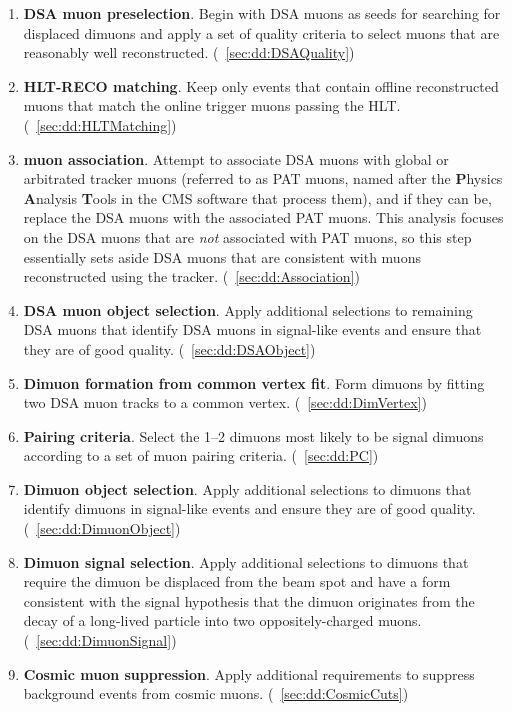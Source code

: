 \begin{enumerate}
  \item \textbf{DSA muon preselection}. Begin with DSA muons as seeds for searching for displaced dimuons and apply a set of quality criteria to select muons that are reasonably well reconstructed. (\Sec~\ref{sec:dd:DSAQuality})
  \item \textbf{HLT-RECO matching}. Keep only events that contain offline reconstructed muons that match the online trigger muons passing the HLT. (\Sec~\ref{sec:dd:HLTMatching})
  \item \textbf{\DSAToPAT muon association}. Attempt to associate DSA muons with global or arbitrated tracker muons (referred to as PAT muons, named after the \textbf{P}hysics \textbf{A}nalysis \textbf{T}ools in the CMS software that process them), and if they can be, replace the DSA muons with the associated PAT muons. This analysis focuses on the DSA muons that are \emph{not} associated with PAT muons, so this step essentially sets aside DSA muons that are consistent with muons reconstructed using the tracker. (\Sec~\ref{sec:dd:Association})
  \item \textbf{DSA muon object selection}. Apply additional selections to remaining DSA muons that identify DSA muons in signal-like events and ensure that they are of good quality. (\Sec~\ref{sec:dd:DSAObject})
  \item \textbf{Dimuon formation from common vertex fit}. Form dimuons by fitting two DSA muon tracks to a common vertex. (\Sec~\ref{sec:dd:DimVertex})
  \item \textbf{Pairing criteria}. Select the 1--2 dimuons most likely to be signal dimuons according to a set of muon pairing criteria. (\Sec~\ref{sec:dd:PC})
  \item \textbf{Dimuon object selection}. Apply additional selections to dimuons that identify dimuons in signal-like events and ensure they are of good quality. (\Sec~\ref{sec:dd:DimuonObject})
  \item \textbf{Dimuon signal selection}. Apply additional selections to dimuons that require the dimuon be displaced from the beam spot and have a form consistent with the signal hypothesis that the dimuon originates from the decay of a long-lived particle into two oppositely-charged muons. (\Sec~\ref{sec:dd:DimuonSignal})
  \item \textbf{Cosmic muon suppression}. Apply additional requirements to suppress background events from cosmic muons. (\Sec~\ref{sec:dd:CosmicCuts})
\end{enumerate}

